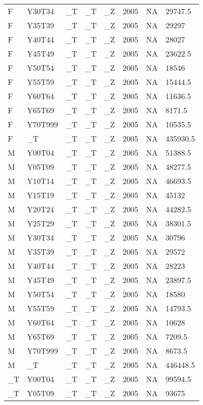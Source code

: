 \begin{longtable}[t]{llllllll}
F & Y30T34 & \_T & \_T & \_Z & 2005 & NA & 29747.5\\
F & Y35T39 & \_T & \_T & \_Z & 2005 & NA & 29297\\
F & Y40T44 & \_T & \_T & \_Z & 2005 & NA & 28027\\
F & Y45T49 & \_T & \_T & \_Z & 2005 & NA & 23622.5\\
\addlinespace
F & Y50T54 & \_T & \_T & \_Z & 2005 & NA & 18546\\
F & Y55T59 & \_T & \_T & \_Z & 2005 & NA & 15444.5\\
F & Y60T64 & \_T & \_T & \_Z & 2005 & NA & 11636.5\\
F & Y65T69 & \_T & \_T & \_Z & 2005 & NA & 8171.5\\
F & Y70T999 & \_T & \_T & \_Z & 2005 & NA & 10535.5\\
\addlinespace
F & \_T & \_T & \_T & \_Z & 2005 & NA & 435930.5\\
M & Y00T04 & \_T & \_T & \_Z & 2005 & NA & 51388.5\\
M & Y05T09 & \_T & \_T & \_Z & 2005 & NA & 48277.5\\
M & Y10T14 & \_T & \_T & \_Z & 2005 & NA & 46693.5\\
M & Y15T19 & \_T & \_T & \_Z & 2005 & NA & 45132\\
\addlinespace
M & Y20T24 & \_T & \_T & \_Z & 2005 & NA & 44282.5\\
M & Y25T29 & \_T & \_T & \_Z & 2005 & NA & 38301.5\\
M & Y30T34 & \_T & \_T & \_Z & 2005 & NA & 30796\\
M & Y35T39 & \_T & \_T & \_Z & 2005 & NA & 29572\\
M & Y40T44 & \_T & \_T & \_Z & 2005 & NA & 28223\\
\addlinespace
M & Y45T49 & \_T & \_T & \_Z & 2005 & NA & 23897.5\\
M & Y50T54 & \_T & \_T & \_Z & 2005 & NA & 18580\\
M & Y55T59 & \_T & \_T & \_Z & 2005 & NA & 14793.5\\
M & Y60T64 & \_T & \_T & \_Z & 2005 & NA & 10628\\
M & Y65T69 & \_T & \_T & \_Z & 2005 & NA & 7209.5\\
\addlinespace
M & Y70T999 & \_T & \_T & \_Z & 2005 & NA & 8673.5\\
M & \_T & \_T & \_T & \_Z & 2005 & NA & 446448.5\\
\_T & Y00T04 & \_T & \_T & \_Z & 2005 & NA & 99594.5\\
\_T & Y05T09 & \_T & \_T & \_Z & 2005 & NA & 93675\\

\end{longtable}

